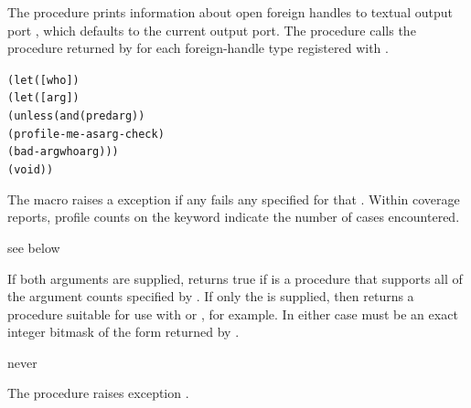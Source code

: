 The  procedure prints information about open
foreign handles to textual output port , which defaults to the current
output port.
The  procedure
calls the procedure returned by 
for each foreign-handle type registered with .

\begin{syntax}
\end{syntax}
\expandsto{}\begin{alltt}\antipar
(let ([who ])
  (let ([arg ])
    (unless (and (pred arg) \etc)
      (profile-me-as arg-check)
      (bad-arg who arg)))
  \etc
  (void))\end{alltt}

The  macro raises a  exception if
any  fails any  specified for that .
Within coverage reports, profile counts on the 
keyword indicate the number of  cases encountered.

\begin{procedure}
\end{procedure}
\returns{} see below

If both arguments are supplied,  returns true if
 is a procedure that supports all of the argument counts specified by
.
If only the  is supplied, then 
returns a procedure 
suitable for use with  or , for example.
In either case  must be an exact integer bitmask of the
form returned by .

\begin{procedure}
\end{procedure}
\returns{} never

The  procedure raises exception .


